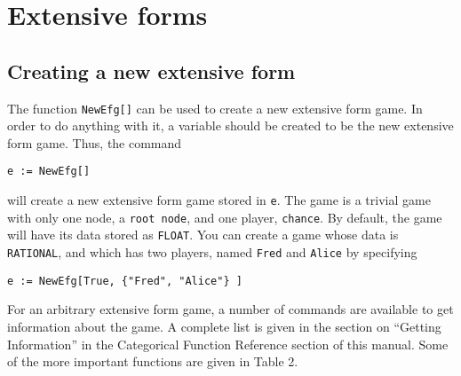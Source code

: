 \section{Extensive forms}

\subsection{Creating a new extensive form}

The function {\tt NewEfg[]} can be used to create a new extensive form
game.  In order to do anything with it, a variable should be created
to be the new extensive form game.  Thus, the command

\begin{verbatim}
e := NewEfg[]
\end{verbatim}

\noindent will create a new extensive form game stored in \verb+e+.
The game is a trivial game with only one node, a \verb+root node+, and
one player, \verb+chance+.  By default, the game will have its data
stored as \verb+FLOAT+.  You can create a game whose data is
\verb+RATIONAL+, and which has two players, named \verb+Fred+ and
\verb+Alice+ by specifying


\begin{verbatim}
e := NewEfg[True, {"Fred", "Alice"} ]
\end{verbatim}

For an arbitrary extensive form game, a number of commands are
available to get information about the game.  A complete list is given
in the section on ``Getting Information'' in the Categorical Function
Reference section of this manual.  Some of the more important
functions are given in Table 2.  

